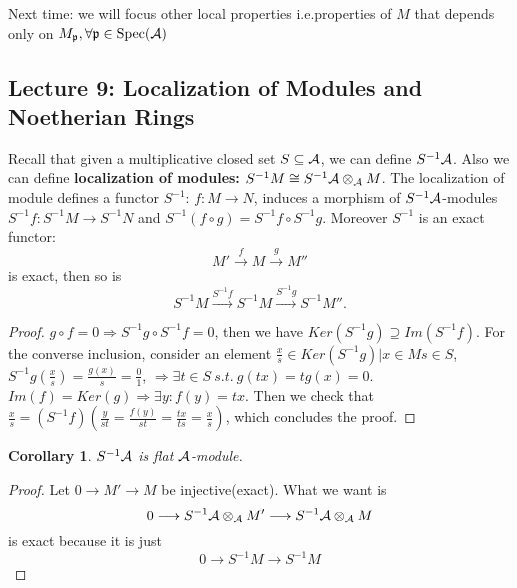 \documentclass[11pt]{article}
\newtheorem{cor}[thm]{Corollary}
\newcommand{\scp}{{\mathfrak p}}
\newcommand{\cala}{{\cal A}}
\newcommand{\Lrta}{\Longrightarrow}
\newcommand{\lrta}{\longrightarrow}
\begin{document}
Next time: we will focus other local properties i.e.properties of $M$ that depends only on  $M_\scp, \forall \scp\in \text{Spec}(\cala)$



\subsection{Lecture 9: Localization of Modules and Noetherian Rings}
Recall that given a multiplicative closed set 
$S\subseteq \cala$, we can define  $S^{-1}\cala$.
Also we can define \textbf{localization of modules:} $S^{-1}M\cong S^{-1}\cala\otimes_\cala M$. The localization of module defines a functor $S^{-1}$:
$f:M\lrta N$, induces a morphism of $S^{-1}\cala$-modules $S^{-1}f:S^{-1}M\lrta S^{-1}N$ and $S^{-1}(f\circ g)=S^{-1}f\circ S^{-1}g$. Moreover $S^{-1}$ is an exact functor:
$$
M'\overset{f}{\lrta}M\overset{g}{\lrta}M''
$$
is exact, then so is 
$$
S^{-1}M\overset{S^{-1}f}{\lrta }S^{-1}M\overset{S^{-1}g}{\lrta } S^{-1}M''.
$$

\begin{proof}
$g\circ f=0\Lrta S^{-1}g\circ S^{-1}f=0$, then we have $Ker(S^{-1}g)\supseteq Im(S^{-1}f)$. For the converse inclusion, consider an element $\frac{x}{s}\in Ker(S^{-1}g)|x\in M s\in S$, $S^{-1}g(\frac{x}{s})=\frac{g(x)}{s}=\frac{0}{1}$, $\Lrta \exists t\in S\ s.t. \ g(tx)=tg(x)=0$. $Im(f)=Ker(g)\Lrta\exists y: f(y)=tx$. Then we check that $\frac{x}{s}=(S^{-1}f)(\frac{y}{st}=\frac{f(y)}{st}=\frac{tx}{ts}=\frac{x}{s})$, which concludes the proof.
\end{proof}

\begin{cor}
$S^{-1}\cala$ is flat $\cala$-module.
\end{cor}
\begin{proof}
Let $0\lrta M'\lrta M$ be injective(exact). What we want is 
$$
0\lrta S^{-1}\cala\otimes_\cala M'\lrta S^{-1
}\cala\otimes _\cala M
$$
is exact because it is just 
$$
0\lrta S^{-1}M\lrta S^{-1}M
$$
\end{proof}
\end{document}
